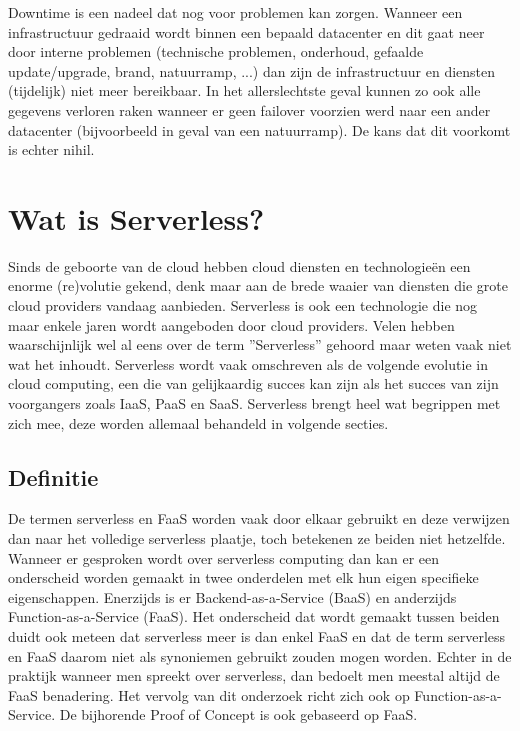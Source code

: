 \begin{description}[style=unboxed, labelwidth=\linewidth, listparindent =0pt]
        \item [Downtime]
        Downtime is een nadeel dat nog voor problemen kan zorgen. Wanneer een infrastructuur gedraaid wordt binnen een bepaald datacenter en dit gaat neer door interne problemen (technische problemen, onderhoud, gefaalde update/upgrade, brand, natuurramp, ...) dan zijn de infrastructuur en diensten (tijdelijk) niet meer bereikbaar. In het allerslechtste geval kunnen zo ook alle gegevens verloren raken wanneer er geen failover voorzien werd naar een ander datacenter (bijvoorbeeld in geval van een natuurramp). De kans dat dit voorkomt is echter nihil.
\end{description}
\newpage

\section{Wat is Serverless?}
Sinds de geboorte van de cloud hebben cloud diensten en technologieën een enorme (re)volutie gekend, denk maar aan de brede waaier van diensten die grote cloud providers vandaag aanbieden. Serverless  is ook een technologie die nog maar enkele jaren wordt aangeboden door cloud providers. Velen hebben waarschijnlijk wel al eens over de term ''Serverless'' gehoord maar weten vaak niet wat het inhoudt. Serverless wordt vaak omschreven als de volgende evolutie in cloud computing, een die van gelijkaardig succes kan zijn als het succes van zijn voorgangers zoals IaaS, PaaS en SaaS. Serverless brengt heel wat begrippen met zich mee, deze worden allemaal behandeld in volgende secties.
 
\subsection{Definitie}
De termen serverless en FaaS worden vaak door elkaar gebruikt en deze verwijzen dan naar het volledige serverless plaatje, toch betekenen ze beiden niet hetzelfde. Wanneer er gesproken wordt over serverless computing dan kan er een onderscheid worden gemaakt in twee onderdelen met elk hun eigen specifieke eigenschappen. Enerzijds is er Backend-as-a-Service (BaaS) en anderzijds Function-as-a-Service (FaaS). Het onderscheid dat wordt gemaakt tussen beiden duidt ook meteen dat serverless meer is dan enkel FaaS en dat de term serverless en FaaS daarom niet als synoniemen gebruikt zouden mogen worden. Echter in de praktijk wanneer men spreekt over serverless, dan bedoelt men meestal altijd de FaaS benadering. Het vervolg van dit onderzoek richt zich ook op Function-as-a-Service. De bijhorende Proof of Concept is ook gebaseerd op FaaS.\autocite{Roberts2017}

